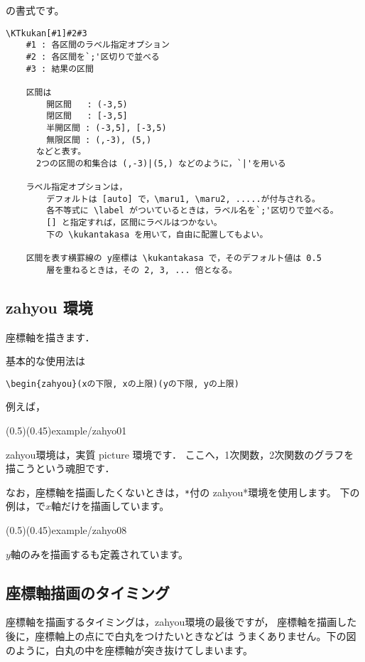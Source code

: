 の書式です。

\begin{boxnote}
\begin{verbatim}
\KTkukan[#1]#2#3
    #1 : 各区間のラベル指定オプション
    #2 : 各区間を`;'区切りで並べる
    #3 : 結果の区間

    区間は
        開区間   : (-3,5)
        閉区間   : [-3,5]
        半開区間 : (-3,5], [-3,5)
        無限区間 : (,-3), (5,)
      などと表す。
      2つの区間の和集合は (,-3)|(5,) などのように，`|'を用いる

    ラベル指定オプションは，
        デフォルトは [auto] で，\maru1, \maru2, .....が付与される。
        各不等式に \label がついているときは，ラベル名を`;'区切りで並べる。
        [] と指定すれば，区間にラベルはつかない。
        下の \kukantakasa を用いて，自由に配置してもよい。

    区間を表す横罫線の y座標は \kukantakasa で，そのデフォルト値は 0.5
        層を重ねるときは，その 2, 3, ... 倍となる。
\end{verbatim}
\end{boxnote}

\subsection{\textsf{zahyou} 環境}
座標軸を描きます．

基本的な使用法は

\begin{jquote}
\begin{verbatim}
\begin{zahyou}(xの下限, xの上限)(yの下限, yの上限)
\end{verbatim}
\end{jquote}

例えば，

\showexample[座標平面](0.5)(0.45){example/zahyo01}

\textsf{zahyou}環境は，実質 \textsf{picture} 環境です．
ここへ，1次関数，2次関数のグラフを描こうという魂胆です．

なお，座標軸を描画したくないときは，\verb/*/付の
\textsf{zahyou*}環境を使用します。
下の例は，で$x$軸だけを描画しています。

(0.5)(0.45){example/zahyo08}

$y$軸のみを描画するも定義されています。

\subsection{座標軸描画のタイミング}
座標軸を描画するタイミングは，zahyou環境の最後ですが，
座標軸を描画した後に，座標軸上の点にで白丸をつけたいときなどは
うまくありません。下の図のように，白丸の中を座標軸が突き抜けてしまいます。

